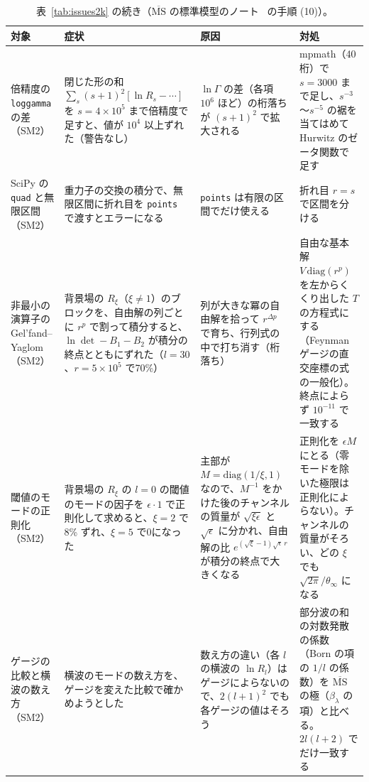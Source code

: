 \documentclass[a4paper,10pt]{ltjsarticle}
\begin{document}
\begin{table}[tbp]
\centering\footnotesize
\caption{表~\ref{tab:issues2k} の続き（$\overline{\mathrm{MS}}$ の標準模型のノート~\cite{smmsbarnote} の手順 (10)）。}
\label{tab:issues2k2}
\begin{tabularx}{\linewidth}{>{\raggedright\arraybackslash}p{2.4cm}>{\raggedright\arraybackslash}X>{\raggedright\arraybackslash}X>{\raggedright\arraybackslash}X}
\toprule
\textbf{対象} & \textbf{症状} & \textbf{原因} & \textbf{対処} \\
\midrule
倍精度の \texttt{loggamma} の差（SM2） & 閉じた形の和 $\sum_s(s+1)^2[\ln R_s-\cdots]$ を $s=4\times10^5$ まで倍精度で足すと、値が $10^4$ 以上ずれた（警告なし） & $\ln\Gamma$ の差（各項 $10^6$ ほど）の桁落ちが $(s+1)^2$ で拡大される & mpmath（40桁）で $s=3000$ まで足し、$s^{-3}$〜$s^{-5}$ の裾を当てはめて Hurwitz のゼータ関数で足す \\
SciPy の \texttt{quad} と無限区間（SM2） & 重力子の交換の積分で、無限区間に折れ目を \texttt{points} で渡すとエラーになる & \texttt{points} は有限の区間でだけ使える & 折れ目 $r=s$ で区間を分ける \\
非最小の演算子の Gel'fand--Yaglom（SM2） & 背景場の $R_\xi$（$\xi\ne1$）のブロックを、自由解の列ごとに $r^p$ で割って積分すると、$\ln\det-B_1-B_2$ が積分の終点とともにずれた（$l=30$、$r=5\times10^5$ で70\%） & 列が大きな冪の自由解を拾って $r^{\Delta p}$ で育ち、行列式の中で打ち消す（桁落ち） & 自由な基本解 $V\,\mathrm{diag}(r^p)$ を左からくくり出した $T$ の方程式にする（Feynman ゲージの直交座標の式の一般化）。終点によらず $10^{-11}$ で一致する \\
閾値のモードの正則化（SM2） & 背景場の $R_\xi$ の $l=0$ の閾値のモードの因子を $\epsilon\cdot1$ で正則化して求めると、$\xi=2$ で8\% ずれ、$\xi=5$ で0になった & 主部が $M=\mathrm{diag}(1/\xi,1)$ なので、$M^{-1}$ をかけた後のチャンネルの質量が $\sqrt{\xi\epsilon}$ と $\sqrt\epsilon$ に分かれ、自由解の比 $e^{(\sqrt\xi-1)\sqrt\epsilon\,r}$ が積分の終点で大きくなる & 正則化を $\epsilon M$ にとる（零モードを除いた極限は正則化によらない）。チャンネルの質量がそろい、どの $\xi$ でも $\sqrt{2\pi}/\theta_\infty$ になる \\
ゲージの比較と横波の数え方（SM2） & 横波のモードの数え方を、ゲージを変えた比較で確かめようとした & 数え方の違い（各 $l$ の横波の $\ln R_l$）はゲージによらないので、$2(l+1)^2$ でも各ゲージの値はそろう & 部分波の和の対数発散の係数（Born の項の $1/l$ の係数）を $\overline{\mathrm{MS}}$ の極（$\beta_\lambda$ の項）と比べる。$2l(l+2)$ でだけ一致する \\
\bottomrule
\end{tabularx}
\end{table}
\end{document}
